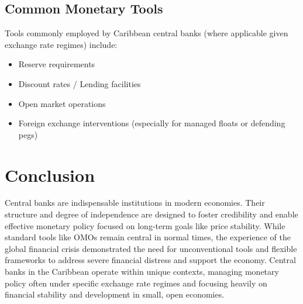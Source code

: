 \subsection{Common Monetary Tools}
Tools commonly employed by Caribbean central banks (where applicable given exchange rate regimes) include:
\begin{itemize}
    \item Reserve requirements
    \item Discount rates / Lending facilities
    \item Open market operations
    \item Foreign exchange interventions (especially for managed floats or defending pegs)
\end{itemize}

\section{Conclusion}

Central banks are indispensable institutions in modern economies. Their structure and degree of independence are designed to foster credibility and enable effective monetary policy focused on long-term goals like price stability. While standard tools like OMOs remain central in normal times, the experience of the global financial crisis demonstrated the need for unconventional tools and flexible frameworks to address severe financial distress and support the economy. Central banks in the Caribbean operate within unique contexts, managing monetary policy often under specific exchange rate regimes and focusing heavily on financial stability and development in small, open economies.
